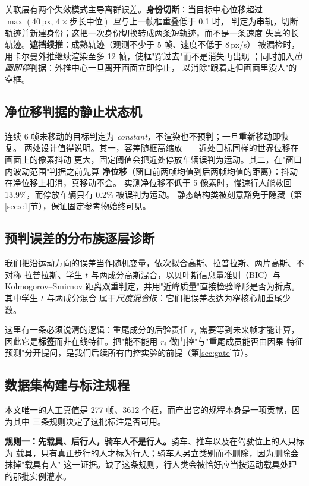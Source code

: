 \documentclass[11pt,a4paper]{ctexart}
\begin{document}
关联层有两个失效模式主导离群误差。\textbf{身份切断}：当目标中心位移超过
$\max(40\,\text{px},\,4\times\text{步长中位})$ \emph{且}与上一帧框重叠低于 0.1 时，
判定为串轨，切断轨迹并新建身份；这把一次身份切换转成两条短轨迹，而不是一条速度
失真的长轨迹。\textbf{遮挡续推}：成熟轨迹（观测不少于 5 帧、速度不低于 8\,px/s）
被漏检时，用卡尔曼外推继续渲染至多 12 帧，使框"穿过去"而不是消失再出现
\citep{kalman1960}；同时加入\emph{出画即停}判据：外推中心一旦离开画面立即停止，
以消除"跟着走但画面里没人"的空框。

\subsection{净位移判据的静止状态机}
\label{sec:c3}

连续 6 帧未移动的目标判定为 \emph{constant}，不渲染也不预判；一旦重新移动即恢复。
两处设计值得说明。其一，容差随框高缩放——近处目标同样的世界位移在画面上的像素抖动
更大，固定阈值会把近处停放车辆误判为运动。其二，在"窗口内波动范围"判据之前先算
\textbf{净位移}（窗口前两帧均值到后两帧均值的距离）：抖动在净位移上相消，真移动不会。
实测净位移不低于 5 像素时，慢速行人能救回 13.9\%，而停放车辆只有 0.2\% 被误判为运动。
静态结构类被刻意豁免于隐藏（第\ref{sec:c1}节），保证固定参考物始终可见。

\subsection{预判误差的分布族逐层诊断}
\label{sec:c4}

我们把沿运动方向的误差当作随机变量，依次拟合高斯、拉普拉斯、两片高斯、不对称
拉普拉斯、学生 $t$ 与两成分高斯混合，以贝叶斯信息量准则（BIC）与 Kolmogorov--Smirnov
距离双重判定，并用"近峰质量"直接检验峰形是否为折点。其中学生 $t$ 与两成分混合
属于\emph{尺度混合}族：它们把误差表达为窄核心加重尾少数。

这里有一条必须说清的逻辑：重尾成分的后验责任 $r_i$ 需要等到未来帧才能计算，
因此它是\textbf{标签}而非在线特征。把"能不能用 $r_i$ 做门控"与"重尾成员能否由因果
特征预测"分开提问，是我们后续所有门控实验的前提（第\ref{sec:gate}节）。

\subsection{数据集构建与标注规程}
\label{sec:c5}

本文唯一的人工真值是 277 帧、3612 个框，而产出它的规程本身是一项贡献，因为其中
三条规则决定了这批标注是否可用。

\textbf{规则一：先载具、后行人，骑车人不是行人。}骑车、推车以及在驾驶位上的人只标为
载具，只有真正步行的人才标为行人；骑车人另立类别而不删除，因为删除会抹掉"载具有人"
这一证据。缺了这条规则，行人类会被恰好应当按运动载具处理的那批实例灌水。
\end{document}
